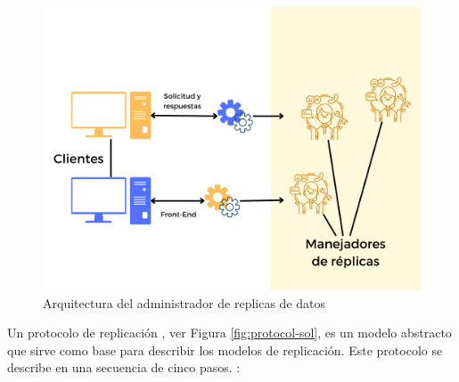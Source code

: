   \begin{figure}   
  	 \begin{center}%
 	\includegraphics[width=0.8\linewidth] {9/4.png } 
 	\caption{Arquitectura del administrador de replicas de datos}
 	\label{fig:adm-rep}
 \end{center} 
 \end{figure}
 
  
 
 Un protocolo de replicaci\'on  \cite{Pedone2000}, ver Figura  \ref{fig:protocol-sol}, es un modelo abstracto que sirve como base para describir los modelos de replicaci\'on. Este protocolo  se describe en una secuencia de cinco pasos. :

 
